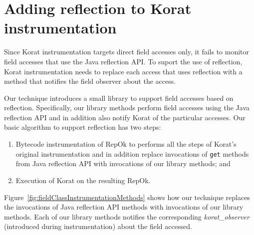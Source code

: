 \section{Adding reflection to Korat instrumentation}
\label{sec:adding-reflection-to-instrumentation}
Since Korat instrumentation targets direct field accesses only, it
fails to monitor field accesses that use the Java reflection API. To
suport the use of reflection, Korat instrumentation needs to replace
each access that uses reflection with a method that notifies the
field observer about the access.

Our technique introduces a small library to support field accesses
based on reflection.  Specifically, our library methods perform field
accesses using the Java reflection API and in addition also notify
Korat of the particular accesses.  Our basic algorithm to support
reflection has two steps:
\begin{enumerate}
\item Bytecode instrumentation of RepOk to performs all the steps of
  Korat's original instrumentation and in addition replace invocations
  of \texttt{get} methods from Java reflection API with invocations of
  our library methods; and
\item Execution of Korat on the resulting RepOk.
\end{enumerate}

Figure~\ref{fig:fieldClassInstrumentationMethods} shows how our
technique replaces the invocations of Java reflection API methods with
invocations of our library methods.  Each of our library methods
notifies the corresponding \emph{korat\_observer} (introduced during
instrumentation) about the field accessed.


